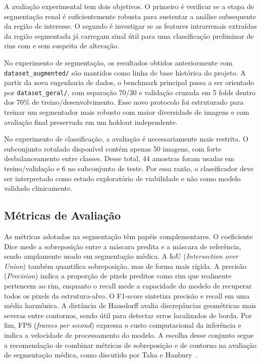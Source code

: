 \documentclass[12pt]{article}
\begin{document}
A avaliação experimental tem dois objetivos. O primeiro é verificar se a etapa de segmentação renal é suficientemente robusta para sustentar a análise subsequente da região de interesse. O segundo é investigar se as features intrarrenais extraídas da região segmentada já carregam sinal útil para uma classificação preliminar de rins com e sem suspeita de alteração.

No experimento de segmentação, os resultados obtidos anteriormente com \texttt{dataset\_augmented/} são mantidos como linha de base histórica do projeto. A partir da nova engenharia de dados, o benchmark principal passa a ser orientado por \texttt{dataset\_geral/}, com separação 70/30 e validação cruzada em 5 folds dentro dos 70\% de treino/desenvolvimento. Esse novo protocolo foi estruturado para treinar um segmentador mais robusto com maior diversidade de imagens e com avaliação final preservada em um holdout independente.

No experimento de classificação, a avaliação é necessariamente mais restrita. O subconjunto rotulado disponível contém apenas 50 imagens, com forte desbalanceamento entre classes. Desse total, 44 amostras foram usadas em treino/validação e 6 no subconjunto de teste. Por essa razão, o classificador deve ser interpretado como estudo exploratório de viabilidade e não como modelo validado clinicamente.

\subsection{Métricas de Avaliação}

As métricas adotadas na segmentação têm papéis complementares. O coeficiente Dice mede a sobreposição entre a máscara predita e a máscara de referência, sendo amplamente usado em segmentação médica. A IoU (\textit{Intersection over Union}) também quantifica sobreposição, mas de forma mais rígida. A precisão (\textit{Precision}) indica a proporção de pixels preditos como rim que realmente pertencem ao rim, enquanto o recall mede a capacidade do modelo de recuperar todos os pixels da estrutura-alvo. O F1-score sintetiza precisão e recall em uma média harmônica. A distância de Hausdorff avalia discrepâncias geométricas mais severas entre contornos, sendo útil para detectar erros localizados de borda. Por fim, FPS (\textit{frames per second}) expressa o custo computacional da inferência e indica a velocidade de processamento do modelo. A escolha desse conjunto segue a recomendação de combinar métricas de sobreposição e de contorno na avaliação de segmentação médica, como discutido por Taha e Hanbury~\cite{Taha2015Metrics}.
\end{document}
